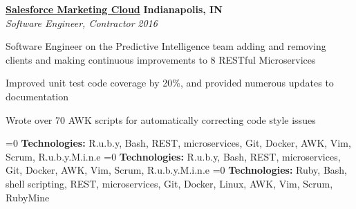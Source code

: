 %
    \headerrow
        {\textbf{\href{https://www.marketingcloud.com/}{Salesforce Marketing Cloud}}}
        {\textbf{Indianapolis, IN}}
    \\
    \headerrow
        {\emph{Software Engineer, Contractor}}
        {\emph{2016}}
    \begin{itemize*}
        \item Software Engineer on the Predictive Intelligence team adding and removing clients
            and making continuous improvements to 8 RESTful Microservices
        \item Improved unit test code coverage by 20\%, and provided numerous updates to documentation
        \item Wrote over 70 AWK scripts for automatically correcting code style issues
    \end{itemize*}

    \ifnum{}=0
        \hspace{1.0em}
        {\textbf{Technologies:} R.u.b.y, Bash, REST, microservices, Git, Docker, AWK, Vim, Scrum, R.u.b.y.M.i.n.e}
    \fi
    \ifnum{}=0
        \hspace{1.0em}
        {\textbf{Technologies:} R.u.b.y, Bash, REST, microservices, Git, Docker, AWK, Vim, Scrum, R.u.b.y.M.i.n.e}
    \fi
    \ifnum{}=0
        \hspace{1.0em}
        {\textbf{Technologies:} Ruby, Bash, shell scripting, REST, microservices, Git, Docker, Linux, AWK, Vim, Scrum, RubyMine}
    \fi
